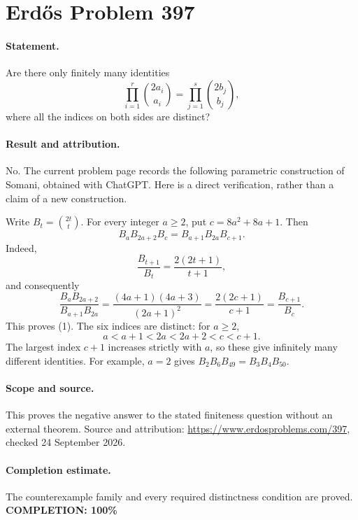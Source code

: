 \section*{Erd\H{o}s Problem 397}

\paragraph{Statement.}
Are there only finitely many identities
\[
 \prod_{i=1}^{r}\binom{2a_i}{a_i}
 =
 \prod_{j=1}^{s}\binom{2b_j}{b_j},
\]
where all the indices on both sides are distinct?

\paragraph{Result and attribution.}
No. The current problem page records the following parametric construction of
Somani, obtained with ChatGPT. Here is a direct verification, rather than a
claim of a new construction.

Write \(B_t=\binom{2t}{t}\). For every integer \(a\geq2\), put
\(c=8a^2+8a+1\). Then
\[
 B_a B_{2a+2}B_c=B_{a+1}B_{2a}B_{c+1}.
 \tag{1}
\]
Indeed,
\[
 \frac{B_{t+1}}{B_t}=\frac{2(2t+1)}{t+1},
\]
and consequently
\[
 \frac{B_aB_{2a+2}}{B_{a+1}B_{2a}}
 =\frac{(4a+1)(4a+3)}{(2a+1)^2}
 =\frac{2(2c+1)}{c+1}
 =\frac{B_{c+1}}{B_c}.
\]
This proves (1). The six indices are distinct: for \(a\geq2\),
\[
 a<a+1<2a<2a+2<c<c+1.
\]
The largest index \(c+1\) increases strictly with \(a\), so these give
infinitely many different identities. For example, \(a=2\) gives
\(B_2B_6B_{49}=B_3B_4B_{50}\).

\paragraph{Scope and source.}
This proves the negative answer to the stated finiteness question without an
external theorem. Source and attribution:
\url{https://www.erdosproblems.com/397}, checked 24 September 2026.

\paragraph{Completion estimate.}
The counterexample family and every required distinctness condition are proved.
\textbf{COMPLETION: 100\%}
